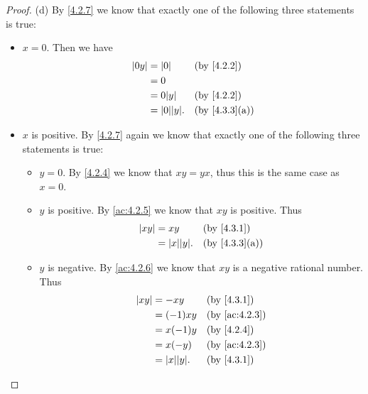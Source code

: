 \begin{proof}{(d)}
	By \cref{4.2.7} we know that exactly one of the following three statements is true:
	\begin{itemize}
		\item \(x = 0\).
		      Then we have
		      \begin{align*}
			      \abs{0y} & = \abs{0}          &  & \by{4.2.2}                  \\
			               & = 0                                                 \\
			               & = 0 \abs{y}        &  & \by{4.2.2}                  \\
			               & = \abs{0} \abs{y}. &  & \text{(by \cref{4.3.3}(a))}
		      \end{align*}
		\item \(x\) is positive.
		      By \cref{4.2.7} again we know that exactly one of the following three statements is true:
		      \begin{itemize}
			      \item \(y = 0\).
			            By \cref{4.2.4} we know that \(xy = yx\), thus this is the same case as \(x = 0\).
			      \item \(y\) is positive.
			            By \cref{ac:4.2.5} we know that \(xy\) is positive.
			            Thus
			            \begin{align*}
				            \abs{xy} & = xy               &  & \by{4.3.1}                  \\
				                     & = \abs{x} \abs{y}. &  & \text{(by \cref{4.3.3}(a))}
			            \end{align*}
			      \item \(y\) is negative.
			            By \cref{ac:4.2.6} we know that \(xy\) is a negative rational number.
			            Thus
			            \begin{align*}
				            \abs{xy} & = -xy              &  & \by{4.3.1}    \\
				                     & = (-1)xy           &  & \by{ac:4.2.3} \\
				                     & = x(-1)y           &  & \by{4.2.4}    \\
				                     & = x(-y)            &  & \by{ac:4.2.3} \\
				                     & = \abs{x} \abs{y}. &  & \by{4.3.1}    \\
			            \end{align*}
		      \end{itemize}

\end{itemize}
\end{proof}
